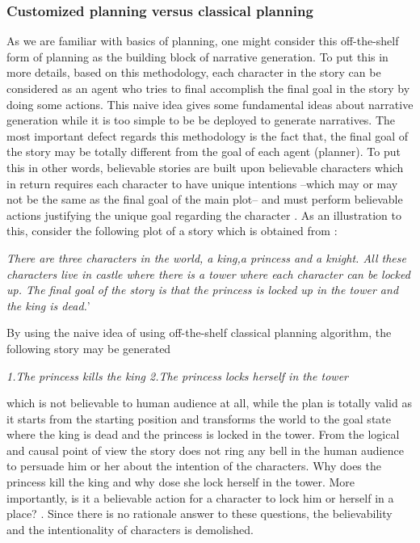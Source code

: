 \documentclass[english]{tktltiki}
\begin{document}
\subsubsection{Customized planning versus classical planning }
As we are familiar with basics of planning, one might consider this off-the-shelf form of planning as the building block of narrative generation. To put this in more details, based on this methodology, each character in the story can be considered as an agent who tries to final accomplish the final goal in the story by doing some actions. This naive idea gives some fundamental ideas about narrative generation while it is too simple to be be deployed to generate narratives.
The most important defect regards this methodology is the fact that, the final goal of the story may be totally different from the goal of each agent (planner). To put this in other words, believable stories are built upon believable characters which in return requires each character to have unique intentions --which may or may not be the same as the final goal of the main plot-- and must perform believable actions justifying the unique goal regarding the character \cite{planning:2010:NPB:1946417.1946422}. As an illustration to this, consider the following plot of a story which is obtained from \cite{planning:2010:NPB:1946417.1946422}:
\begin{flushleft}
\textit{There are three characters in the world, a king,a princess and a knight. All these characters live in castle where there is a tower where each character can be locked up. The final goal of the story is that the princess is locked up in the tower and the king is dead.}'
\end{flushleft}
By using the naive idea of using off-the-shelf classical planning algorithm, the following story may be generated
\begin{flushleft}
\textit{1.The princess kills the king \newline 2.The princess locks herself in the tower}
\end{flushleft}
which is not believable to human audience at all, while the plan is totally valid as it starts from the starting position and transforms the world to the goal state where the king is dead and the princess is locked in the tower. From the logical and causal point of view the story does not ring any bell in the human audience to persuade him or her about the intention of the characters. Why does the princess kill the king and why dose she lock herself in the tower. More importantly, is it a believable action for a character to lock him or herself in a place? . Since there is no rationale answer to these questions, the believability and the intentionality of characters is demolished.
\end{document}
